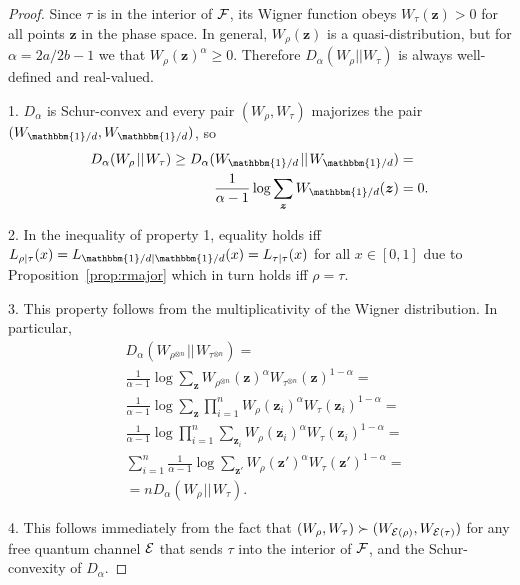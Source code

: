 \documentclass[
twocolumn,
superscriptaddress
]{revtex4-1}
\def\id{\mathbbm{1}}
\def\z{\boldsymbol{z}}
\def\E{{\cal E}}
\def\F{{\cal F}}
\begin{document}
\begin{proof}
	Since $\tau$ is in the interior of $\F$, its Wigner function obeys $W_\tau(\z) >0$ for all points $\z$ in the phase space. 
In general, $W_\rho(\z)$ is a quasi-distribution, but for $\alpha = 2a/2b-1$ we that $W_{\rho}(\z)^\alpha \geq 0$. 
Therefore $D_\alpha (W_\rho || W_\tau)$ is always well-defined and real-valued.

1. $D_\alpha$ is Schur-convex and every pair $(W_{\rho}, W_{\tau})$ majorizes the pair $(W_{\id/d}, W_{\id/d})$, so
\begin{align}
	D_\alpha(W_{\rho} \hspace{1pt}||\hspace{1pt} W_{\tau}) \geq D_\alpha(W_{\id/d} \hspace{1pt}||\hspace{1pt} W_{\id/d}) &= \nonumber\\
	\frac{1}{\alpha-1} \log \sum_{\z} W_{\id/d}(\z) &= 0.
\end{align}

2. In the inequality of property 1, equality holds iff $L_{\rho|\tau}(x) = L_{\id/d|\id/d}(x) = L_{\tau|\tau}(x)$ for all $x\in [0,1]$ due to Proposition~\ref{prop:rmajor} which in turn holds iff $\rho = \tau$.

3. This property follows from the multiplicativity of the Wigner distribution.
In particular,
\begin{align}
	&D_\alpha(W_{\rho^{\otimes n}} \hspace{1pt}||\hspace{1pt} W_{\tau^{\otimes n}}) = \nonumber\\
	&\frac{1}{\alpha - 1} \log \sum_{\z} W_{\rho^{\otimes n}}(\z)^\alpha W_{\tau^{\otimes n}}(\z)^{1-\alpha} = \nonumber\\
	&\frac{1}{\alpha - 1} \log \sum_{\z} \prod_{i=1}^n W_{\rho}(\z_i)^\alpha W_{\tau}(\z_i)^{1-\alpha} = \nonumber\\
	&\frac{1}{\alpha - 1} \log \prod_{i=1}^n \sum_{\z_i} W_{\rho}(\z_i)^\alpha W_{\tau}(\z_i)^{1-\alpha} = \nonumber\\
	&\sum_{i=1}^n \frac{1}{\alpha - 1} \log \sum_{\z'} W_{\rho}(\z')^\alpha W_{\tau}(\z')^{1-\alpha} = \nonumber\\
	&= n D_{\alpha}(W_\rho \hspace{1pt}||\hspace{1pt} W_\tau).
\end{align}

4. This follows immediately from the fact that $(W_\rho, W_\tau) \succ (W_{\E(\rho)}, W_{\E(\tau)})$ for any free quantum channel $\E$ that sends $\tau$ into the interior of $\F$, and the Schur-convexity of $D_\alpha$.
\end{proof}
\end{document}
